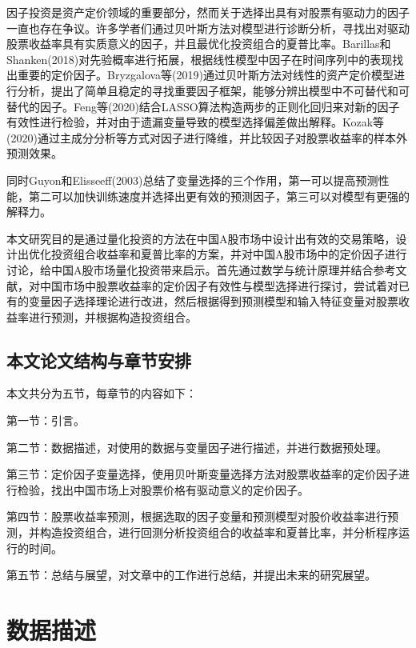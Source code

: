 \documentclass[12pt]{article} %
\begin{document}
	因子投资是资产定价领域的重要部分，然而关于选择出具有对股票有驱动力的因子一直也存在争议。许多学者们通过贝叶斯方法对模型进行诊断分析，寻找出对驱动股票收益率具有实质意义的因子，并且最优化投资组合的夏普比率\cite{anderson2016robust}。Barillas和Shanken(2018)对先验概率进行拓展，根据线性模型中因子在时间序列中的表现找出重要的定价因子\cite{barillas2018comparing}。Bryzgalova等(2019)通过贝叶斯方法对线性的资产定价模型进行分析，提出了简单且稳定的寻找重要因子框架，能够分辨出模型中不可替代和可替代的因子\cite{bryzgalova2019bayesian}。Feng等(2020)结合LASSO算法构造两步的正则化回归来对新的因子有效性进行检验，并对由于遗漏变量导致的模型选择偏差做出解释\cite{feng2020taming}。Kozak等(2020)通过主成分分析等方式对因子进行降维，并比较因子对股票收益率的样本外预测效果\cite{kozak2020shrinking}。
	
	同时Guyon和Elisseeff(2003)总结了变量选择的三个作用，第一可以提高预测性能，第二可以加快训练速度并选择出更有效的预测因子，第三可以对模型有更强的解释力\cite{guyon2003introduction}。
	
	本文研究目的是通过量化投资的方法在中国A股市场中设计出有效的交易策略，设计出优化投资组合收益率和夏普比率的方案，并对中国A股市场中的定价因子进行讨论，给中国A股市场量化投资带来启示。首先通过数学与统计原理并结合参考文献，对中国市场中股票收益率的定价因子有效性与模型选择进行探讨，尝试着对已有的变量因子选择理论进行改进，然后根据得到预测模型和输入特征变量对股票收益率进行预测，并根据构造投资组合。
	
	\subsection{本文论文结构与章节安排}
	本文共分为五节，每章节的内容如下：
	
	第一节：引言。
	
	第二节：数据描述，对使用的数据与变量因子进行描述，并进行数据预处理。
	
	第三节：定价因子变量选择，使用贝叶斯变量选择方法对股票收益率的定价因子进行检验，找出中国市场上对股票价格有驱动意义的定价因子。
	
	第四节：股票收益率预测，根据选取的因子变量和预测模型对股价收益率进行预测，并构造投资组合，进行回测分析投资组合的收益率和夏普比率，并分析程序运行的时间。
	
	第五节：总结与展望，对文章中的工作进行总结，并提出未来的研究展望。

	\newpage
	\section{数据描述}
\end{document}
